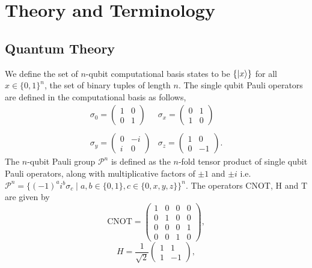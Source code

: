 \documentclass{article}
\theoremstyle{definition}
\theoremstyle{problem}
\theoremstyle{lemma}
\begin{document}
	\FloatBarrier
	\section{Theory and Terminology}
	\label{s2_Theory}
		\subsection{Quantum Theory}
		We define the set of $n$-qubit computational basis states to be $\{\left\vert{x}\right\rangle\}$ for all $x \in \{0,1\}^n$, the set of binary tuples of length $n$.		
		The single qubit Pauli operators are defined in the computational basis as follows,
		\begin{equation}
		\label{e1_Paulis}
		\begin{matrix}
		\sigma_0 = \begin{pmatrix}1 & 0 \\ 0 & 1\end{pmatrix} & \sigma_x = \begin{pmatrix}0 & 1 \\ 1 & 0\end{pmatrix} \\
		& \\
		\sigma_y = \begin{pmatrix}0 & -i \\ i & 0\end{pmatrix} & \sigma_z = \begin{pmatrix}1 & 0 \\ 0 & -1\end{pmatrix}.
		\end{matrix}
		\end{equation}
		The $n$-qubit Pauli group $\mathcal{P}^n$ is defined as the $n$-fold tensor product of single qubit Pauli operators, along with multiplicative factors of $\pm1$ and $\pm i$ i.e. $\mathcal{P}^n = \{\left(-1\right)^a i^b \sigma_c \mid a,b \in \{0,1\}, c \in\{0,x,y,z\}\}^n$.	
		The operators CNOT, H and T are given by
		\begin{equation}
		\label{e2_CNOT}
		\text{CNOT} = \begin{pmatrix}
		1 & 0 & 0 & 0 \\
		0 & 1 & 0 & 0 \\
		0 & 0 & 0 & 1 \\
		0 & 0 & 1 & 0
		\end{pmatrix},
		\end{equation}
		\begin{equation}
		\label{e3_H}
		H = \frac{1}{\sqrt{2}}\begin{pmatrix}
		1 & 1 \\
		1 & -1
		\end{pmatrix},
		\end{equation}
\end{document}
